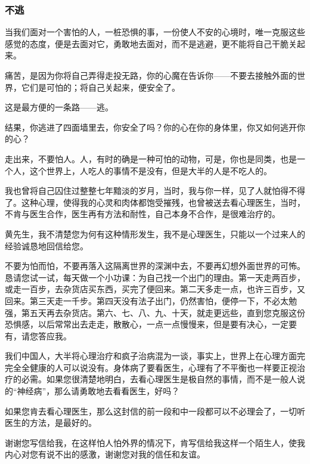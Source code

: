 \subsubsection{不逃}


\par {}
\par 当我们面对一个害怕的人，一桩恐惧的事，一份使人不安的心境时，唯一克服这些感觉的态度，便是去面对它，勇敢地去面对，而不是逃避，更不能将自己干脆关起来。
\par 痛苦，是因为你将自己弄得走投无路，你的心魔在告诉你——不要去接触外面的世界，它们是可怕的；将自己关起来，便安全了。
\par 这是最方便的一条路——逃。
\par 结果，你逃进了四面墙里去，你安全了吗？你的心在你的身体里，你又如何逃开你的心？
\par 走出来，不要怕人。人，有时的确是一种可怕的动物，可是，你也是同类，也是一个人，这个世界上，人吃人的事情不是没有，但是大半的人是不吃人的。
\par 我也曾将自己囚住过整整七年黯淡的岁月，当时，我与你一样，见了人就怕得不得了。这种心理，使得我的心灵和肉体都饱受摧残，也曾被送去看心理医生，当时，不肯与医生合作，医生再有方法和耐性，自己本身不合作，是很难治疗的。
\par 黄先生，我不清楚您为何有这种情形发生，我不是心理医生，只能以一个过来人的经验诚恳地回信给您。
\par 不要为怕而怕，不要再落入这隔离世界的深渊中去，不要再幻想外面世界的可怖。恳请您试一试，每天做一个小功课：为自己找一个出门的理由。第一天走两百步，或走一百步，去杂货店买东西，买完了便回来。第二天多走一点，也许三百步，又回来。第三天走一千步。第四天没有法子出门，仍然害怕，便停一下，不必太勉强，第五天再去杂货店。第六、七、八、九、十天，就走更远些，直到您克服这份恐惧感，以后常常出去走走，散散心，一点一点慢慢来，但是要有决心，一定要有，请您答应我。
\par 我们中国人，大半将心理治疗和疯子治病混为一谈，事实上，世界上在心理方面完完全全健康的人可以说没有。身体病了要看医生，心理有了不平衡也一样要正视治疗的必需。如果您很清楚地明白，去看心理医生是极自然的事情，而不是一般人说的“神经病”，那么请勇敢地去看看医生，好吗？
\par 如果您肯去看心理医生，那么这封信的前一段和中一段都可以不必理会了，一切听医生的方法，是最好的。
\par 谢谢您写信给我，在这样怕人怕外界的情况下，肯写信给我这样一个陌生人，使我内心对您有说不出的感激，谢谢您对我的信任和友谊。
\par {}
\par {}


